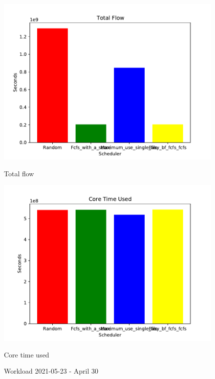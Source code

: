 \documentclass[a4paper]{article}
\begin{document}
\begin{figure}[H]
\begin{minipage}[b]{0.5\linewidth}
    \centering
    \includegraphics[width=1.11\linewidth]{MBSS/plot/2021-05-23_Total_flow.pdf} 
    \caption{Total flow} 
    \vspace{4ex}
  \end{minipage}%
  \begin{minipage}[b]{0.5\linewidth}
    \centering
    \includegraphics[width=1.11\linewidth]{MBSS/plot/2021-05-23_Core_time_used.pdf} 
    \caption{Core time used} 
    \vspace{4ex}
  \end{minipage}
  \caption{Workload 2021-05-23 - April 30}
\end{figure}
\end{document}
